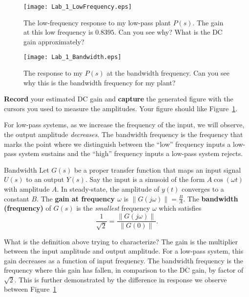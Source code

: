 %
\begin{figure}
  \texttt{[image: Lab\_1\_LowFrequency.eps]}
  \caption[Low Frequency Response of a Low-Pass Plant]{The low-frequency response to my low-pass plant \(P(s).\) The gain
  at this low frequency is \(0.8395.\) Can you see why? What is the DC
  gain approximately?}
  \label{fig:lab1:lowfreq}
\end{figure}
%
\begin{figure}
  \texttt{[image: Lab\_1\_Bandwidth.eps]}
  \caption[Time-Domain Response of a First-Order System at the Bandwidth Frequency]{The response to my \(P(s)\) at the bandwidth frequency.
  Can you see why this is the bandwidth frequency for my plant?}
  \label{fig:lab1:bandwidth}
\end{figure}
%
\begin{deliverable}[label={lab1:d1}]
  \textbf{Record} your estimated DC gain and \textbf{capture} the generated
  figure with the cursors you used to measure the amplitudes.
  Your figure should like Figure~\ref{fig:lab1:lowfreq}.
\end{deliverable}
%
For low-pass systems, as we increase the frequency of the input, we will
observe, the output amplitude \emph{decreases}. The bandwidth frequency
is the frequency that marks the point where we distinguish between the
``low'' frequency inputs a low-pass system sustains and the ``high'' frequency
inputs a low-pass system rejects.
%
\begin{definition}[label={def:bandwidth}]{Bandwidth}
  Let \(G(s)\) be a proper transfer function
  that maps an input signal \(U(s)\) to an output \(Y(s).\)
%
  Say the input is a sinusoid of the form \(A \cos(\omega t)\) with amplitude
  \(A.\) In steady-state, the amplitude of \(y(t)\) converges to a constant
  \(B.\) The \textbf{gain at frequency \(\omega\)} is
  \(\left\|G(j\omega)\right\| = \frac{B}{A}.\)
%
  The \textbf{bandwidth (frequency)} of \(G(s)\) is the \emph{smallest}
  frequency \(\omega\) which satisfies
  \[
    \frac{1}{\sqrt{2}} = \frac{\left\|G(j\omega)\right\|}{\left\|G(0)\right\|}.
  \]
\end{definition}
%
What is the definition above trying to characterize? The
gain is the multiplier between the input amplitude and output amplitude. For
a low-pass system, this gain decreases as a function of input frequency. The
bandwidth frequency is the frequency where this gain has fallen, in comparison
to the DC gain, by factor of \(\sqrt{2}.\) This is further demonstrated
by the difference in response we observe between Figure~\ref{fig:lab1:lowfreq}
